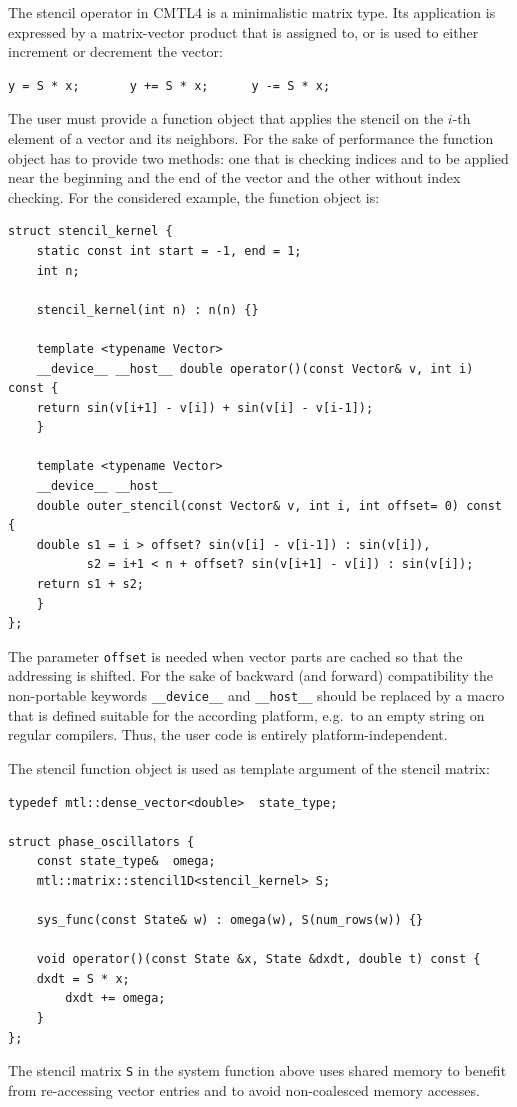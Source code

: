 \documentclass[final]{siamltex}
\newcommand{\code}[1]{\lstinline$#1$}
\begin{document}
The stencil operator in CMTL4 is a minimalistic matrix type.
Its application is expressed by a matrix-vector product that is assigned
to, or is used to either increment or decrement the vector:
\begin{lstlisting}
y = S * x;       y += S * x;      y -= S * x;
\end{lstlisting}
The user must provide a function object that applies the stencil on
the $i$-th element of a vector and its neighbors.
For the sake of performance the function object has to provide two methods:
one that is checking indices and to be applied near the beginning and the end
of the vector and the other without index checking.  For the considered
example, the function object is:
\begin{lstlisting}
struct stencil_kernel {
    static const int start = -1, end = 1;
    int n;

    stencil_kernel(int n) : n(n) {}

    template <typename Vector>
    __device__ __host__ double operator()(const Vector& v, int i) const {
	return sin(v[i+1] - v[i]) + sin(v[i] - v[i-1]);
    }

    template <typename Vector>
    __device__ __host__
    double outer_stencil(const Vector& v, int i, int offset= 0) const {
	double s1 = i > offset? sin(v[i] - v[i-1]) : sin(v[i]),
	       s2 = i+1 < n + offset? sin(v[i+1] - v[i]) : sin(v[i]);
	return s1 + s2;
    }
};
\end{lstlisting}
The parameter \code{offset} is needed when vector parts are cached so that the
addressing is shifted.
For the sake of backward (and forward) compatibility the non-portable keywords
\code{__device__} and \code{__host__} should be replaced by a macro that is
defined suitable for the according platform, e.g.~to an empty string on regular
compilers.  Thus, the user code is entirely platform-independent.

The stencil function object is used as template argument of the stencil matrix:
\begin{lstlisting}
typedef mtl::dense_vector<double>  state_type;

struct phase_oscillators {
    const state_type&  omega;
    mtl::matrix::stencil1D<stencil_kernel> S;

    sys_func(const State& w) : omega(w), S(num_rows(w)) {}

    void operator()(const State &x, State &dxdt, double t) const {
	dxdt = S * x;
        dxdt += omega;
    }
};
\end{lstlisting}
The stencil matrix \code{S} in the system function above
uses shared memory to benefit from re-accessing vector entries
and to avoid non-coalesced memory accesses.
\end{document}
